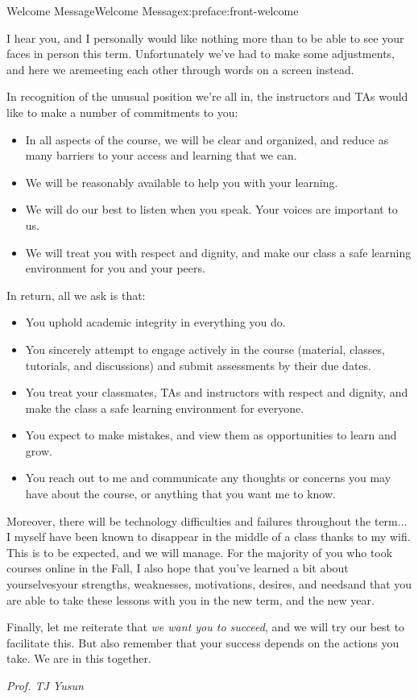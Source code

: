 \documentclass[oneside,10pt,]{book}
\numberwithin{equation}{section}
\begin{document}
\begin{preface}{Welcome Message}{}{Welcome Message}{}{}{x:preface:front-welcome}
\begin{sidebyside}{1}{0.15}{0.15}{0}
\begin{sbspanel}{0.6}
\end{sbspanel}%
\end{sidebyside}%
\par
I hear you, and I personally would like nothing more than to be able to see your faces in person this term. Unfortunately we've had to make some adjustments, and here we are\textemdash{}meeting each other through words on a screen instead.%
\par
In recognition of the unusual position we're all in, the instructors and TAs would like to make a number of commitments to you:%
\begin{itemize}[label=\textbullet]
\item{}In all aspects of the course, we will be clear and organized, and reduce as many barriers to your access and learning that we can.%
\item{}We will be reasonably available to help you with your learning.%
\item{}We will do our best to listen when you speak. Your voices are important to us.%
\item{}We will treat you with respect and dignity, and make our class a safe learning environment for you and your peers.%
\end{itemize}
In return, all we ask is that:%
\begin{itemize}[label=\textbullet]
\item{}You uphold academic integrity in everything you do.%
\item{}You sincerely attempt to engage actively in the course (material, classes, tutorials, and discussions) and submit assessments by their due dates.%
\item{}You treat your classmates, TAs and instructors with respect and dignity, and make the class a safe learning environment for everyone.%
\item{}You expect to make mistakes, and view them as opportunities to learn and grow.%
\item{}You reach out to me and communicate any thoughts or concerns you may have about the course, or anything that you want me to know.%
\end{itemize}
%
\par
Moreover, there will be technology difficulties and failures throughout the term... I myself have been known to disappear in the middle of a class thanks to my wifi. This is to be expected, and we will manage. For the majority of you who took courses online in the Fall, I also hope that you've learned a bit about yourselves\textemdash{}your strengths, weaknesses, motivations, desires, and needs\textemdash{}and that you are able to take these lessons with you in the new term, and the new year.
\par
Finally, let me reiterate that \emph{we want you to succeed}, and we will try our best to facilitate this. But also remember that your success depends on the actions you take. We are in this together.%
\par
\emph{Prof. TJ Yusun}%
\end{preface}
\end{document}
